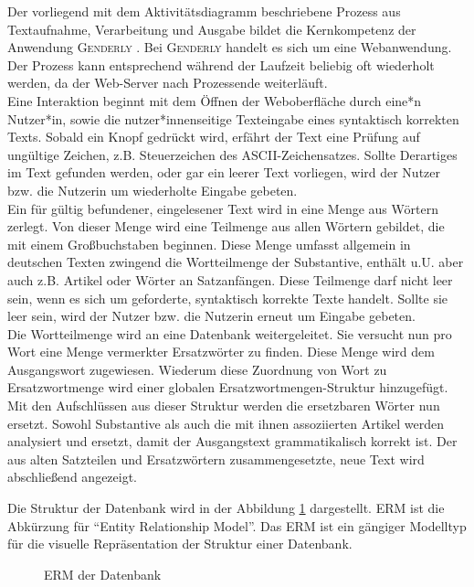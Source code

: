 \documentclass[paper=a4, parskip=half]{scrreprt}
\newcommand{\Genderly}{\textsc{Genderly }}
\begin{document}
Der vorliegend mit dem Aktivitätsdiagramm beschriebene Prozess aus Textaufnahme, Verarbeitung und Ausgabe bildet die Kernkompetenz der Anwendung \Genderly. Bei \Genderly handelt es sich um eine Webanwendung. Der Prozess kann entsprechend während der Laufzeit beliebig oft wiederholt werden, da der Web-Server nach Prozessende weiterläuft.\\
Eine Interaktion beginnt mit dem Öffnen der Weboberfläche durch eine*n Nutzer*in, sowie die nutzer*innenseitige Texteingabe eines syntaktisch korrekten Texts. Sobald ein Knopf gedrückt wird, erfährt der Text eine Prüfung auf ungültige Zeichen, z.B. Steuerzeichen des ASCII-Zeichensatzes. Sollte Derartiges im Text gefunden werden, oder gar ein leerer Text vorliegen, wird der Nutzer bzw. die Nutzerin um wiederholte Eingabe gebeten.\\
Ein für gültig befundener, eingelesener Text wird in eine Menge aus Wörtern zerlegt. Von dieser Menge wird eine Teilmenge aus allen Wörtern gebildet, die mit einem Großbuchstaben beginnen. Diese Menge umfasst allgemein in deutschen Texten zwingend die Wortteilmenge der Substantive, enthält u.U. aber auch z.B. Artikel oder Wörter an Satzanfängen. Diese Teilmenge darf nicht leer sein, wenn es sich um geforderte, syntaktisch korrekte Texte handelt. Sollte sie leer sein, wird der Nutzer bzw. die Nutzerin erneut um Eingabe gebeten.\\
Die Wortteilmenge wird an eine Datenbank weitergeleitet. Sie versucht nun pro Wort eine Menge vermerkter Ersatzwörter zu finden. Diese Menge wird dem Ausgangswort zugewiesen. Wiederum diese Zuordnung von Wort zu Ersatzwortmenge wird einer globalen Ersatzwortmengen-Struktur hinzugefügt. Mit den Aufschlüssen aus dieser Struktur werden die ersetzbaren Wörter nun ersetzt. Sowohl Substantive als auch die mit ihnen assoziierten Artikel werden analysiert und ersetzt, damit der Ausgangstext grammatikalisch korrekt ist.  Der aus alten Satzteilen und Ersatzwörtern zusammengesetzte, neue Text wird abschließend angezeigt.

Die Struktur der Datenbank wird in der Abbildung \ref{fig:ERM} dargestellt.
ERM ist die Abkürzung für ``Entity Relationship Model''. Das ERM ist ein gängiger Modelltyp für die visuelle Repräsentation der Struktur einer Datenbank. 

\begin{figure}[hbt!]
  \centering
  \vspace{-0.25cm}
  \caption[ERM der Datenbank]{ERM der Datenbank}
  \label{fig:ERM}
\end{figure}
\end{document}
